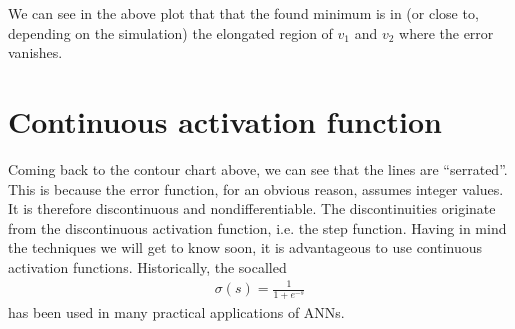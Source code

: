 \documentclass[letterpaper,10pt,english]{jupyterBook}
\begin{document}
\begin{sphinxVerbatim}[commandchars=\\\{\}]
 

 
 

   

\end{sphinxVerbatim}

\noindent{}

\sphinxAtStartPar
We can see in the above plot that that the found minimum is in (or close to, depending on the simulation) the elongated region of \( v_1 \) and \( v_2\) where the error vanishes.


\section{Continuous activation function}
\label{\detokenize{docs/backprop:continuous-activation-function}}
\sphinxAtStartPar
Coming back to the contour chart above, we can see that the lines are “serrated”. This is because the error function, for an obvious reason, assumes integer values. It is therefore discontinuous and non\sphinxhyphen{}differentiable. The discontinuities originate from the discontinuous activation function, i.e. the step function. Having in mind the techniques we will get to know soon, it is advantageous to use continuous activation functions. Historically, the so\sphinxhyphen{}called 
\begin{equation*}
\begin{split} \sigma(s)=\frac{1}{1+e^{-s}}\end{split}
\end{equation*}
\sphinxAtStartPar
has been used in many practical applications of ANNs.
\end{document}
